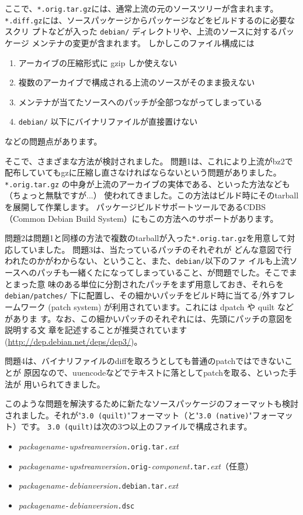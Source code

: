 \documentclass[mingoth,a4paper]{jsarticle}
\begin{document}
ここで、\verb|*.orig.tar.gz|には、通常上流の元のソースツリーが含まれます。
\verb|*.diff.gz|には、ソースパッケージからパッケージなどをビルドするのに必要なスクリ
プトなどが入った \verb|debian/| ディレクトリや、上流のソースに対するパッケージ
メンテナの変更が含まれます。
しかしこのファイル構成には
\begin{enumerate}
 \item アーカイブの圧縮形式に gzip しか使えない
 \item 複数のアーカイブで構成される上流のソースがそのまま扱えない
 \item メンテナが当てたソースへのパッチが全部つながってしまっている
 \item \verb|debian/| 以下にバイナリファイルが直接置けない
\end{enumerate}
などの問題点があります。

そこで、さまざまな方法が検討されました。
問題1は、これにより上流がbz2で配布していてもgzに圧縮し直さなければならないという問題がありました。
\verb|*.orig.tar.gz| の中身が上流のアーカイブの実体である、といった方法なども（ちょっと無駄ですが...）
使われてきました。この方法はビルド時にそのtarballを展開して作業します。
パッケージビルドサポートツールであるCDBS（Common Debian Build System）にもこの方法へのサポートがあります。

問題2は問題1と同様の方法で複数のtarballが入った\verb|*.orig.tar.gz|を用意して対応していました。
問題3は、当たっているパッチのそれぞれが
どんな意図で行われたのかがわからない、ということ、また、\verb|debian/|以下のファ
イルも上流ソースへのパッチも一緒くたになってしまっていること、が問題でした。そこでまとまった意
味のある単位に分割されたパッチをまず用意しておき、それらを
\verb|debian/patches/| 下に配置し、その細かいパッチをビルド時に当てる/外すフレームワーク
(patch system) が利用されています。これには dpatch や quilt などがありま
す。なお、この細かいパッチのそれぞれには、先頭にパッチの意図を説明する文
章を記述することが推奨されています(\url{http://dep.debian.net/deps/dep3/})。

問題4は、バイナリファイルのdiffを取ろうとしても普通のpatchではできないことが
原因なので、uuencodeなどでテキストに落としてpatchを取る、といった手法が
用いられてきました。

このような問題を解決するために新たなソースパッケージのフォーマットも検討
されました。それが"\verb|3.0 (quilt)|"フォーマット（と"\verb|3.0 (native)|"フォーマット）です。
\verb|3.0 (quilt)|は次の3つ以上のファイルで構成されます。
\begin{itemize}
 \item \textit{packagename}\verb|-|\textit{upstreamversion}\verb|.orig.tar.|\textit{ext}
 \item
      \textit{packagename}\verb|-|\textit{upstreamversion}\verb|.orig-|\textit{component}\verb|.tar.|\textit{ext}（任意）
 \item \textit{packagename}\verb|-|\textit{debianversion}\verb|.debian.tar.|\textit{ext}
 \item \textit{packagename}\verb|-|\textit{debianversion}\verb|.dsc|
\end{itemize}
\end{document}
